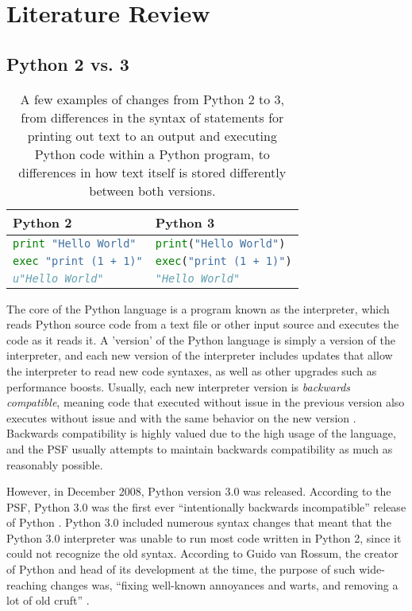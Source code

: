 \section{Literature Review}

\subsection{Python 2 vs. 3}
\begin{table*}[b!]
    \begin{tabular}{@{}l|l@{}}
    \toprule
    Python 2             & Python 3              \\ \midrule
    \lstinline[language=Python, style=pythonstyle]|print "Hello World"|  & \lstinline[language=Python, style=pythonstyle]|print("Hello World")|  \\
    \lstinline[language=Python, style=pythonstyle]|exec "print (1 + 1)"| & \lstinline[language=Python, style=pythonstyle]|exec("print (1 + 1)")| \\
    \lstinline[language=Python, style=pythonstyle]|u"Hello World"|       & \lstinline[language=Python, style=pythonstyle]|"Hello World"|\\  \bottomrule      
    \end{tabular}
    \caption{A few examples of changes from Python 2 to 3, from differences in the syntax of statements for printing out text to an output and executing Python code within a Python program, to differences in how text itself is stored differently between both versions.}
    \label{tab:python-2-vs-3}
\end{table*}

The core of the Python language is a program known as the interpreter, which reads Python source code from a text file or other input source and executes the code as it reads it. A 'version' of the Python language is simply a version of the interpreter, and each new version of the interpreter includes updates that allow the interpreter to read new code syntaxes, as well as other upgrades such as performance boosts. Usually, each new interpreter version is \textit{backwards compatible}, meaning code that executed without issue in the previous version also executes without issue and with the same behavior on the new version \autocite{Malloy}. Backwards compatibility is highly valued due to the high usage of the language, and the PSF usually attempts to maintain backwards compatibility as much as reasonably possible.

However, in December 2008, Python version 3.0 was released. According to the PSF, Python 3.0 was the first ever “intentionally backwards incompatible” release of Python \autocite{vanRossum}. Python 3.0 included numerous syntax changes that meant that the Python 3.0 interpreter was unable to run most code written in Python 2, since it could not recognize the old syntax. According to Guido van Rossum, the creator of Python and head of its development at the time, the purpose of such wide-reaching changes was, “fixing well-known annoyances and warts, and removing a lot of old cruft” \autocite{vanRossum}.

